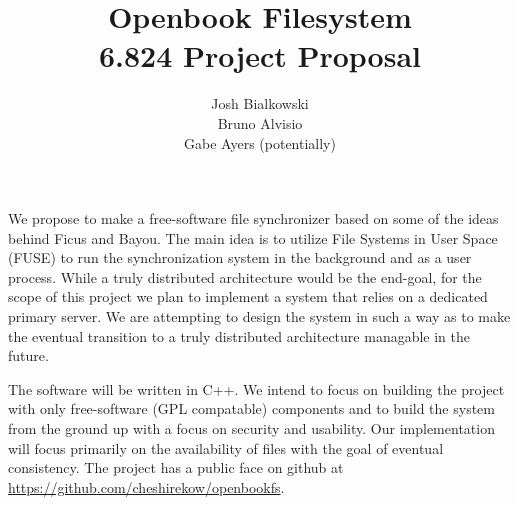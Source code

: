 \documentclass{article}
\title
{%
   Openbook Filesystem \\
   \small 6.824 Project Proposal
}
\author
{%
   \small Josh Bialkowski \\
   \small Bruno Alvisio \\
   \small Gabe Ayers (potentially)
}
\begin{document}
\maketitle

We propose to make a free-software file synchronizer based on some of the ideas 
behind Ficus and Bayou. The main idea is to utilize File Systems in User Space
(FUSE) to run the synchronization system in the background and as a user 
process. While a truly distributed architecture would be the end-goal, for the
scope of this project we plan to implement a system that relies on a dedicated
primary server. We are attempting to design the system in such a way as to make
the eventual transition to a truly distributed architecture managable in the
future. 

The software will be written in C++. We intend to focus on building the project
with only free-software (GPL compatable) components and to build the system 
from the ground up with a focus on security and usability. Our implementation 
will focus primarily on the availability of files with the goal of eventual
consistency. The project has a public face on github at 
\url{https://github.com/cheshirekow/openbookfs}. 
\end{document}
